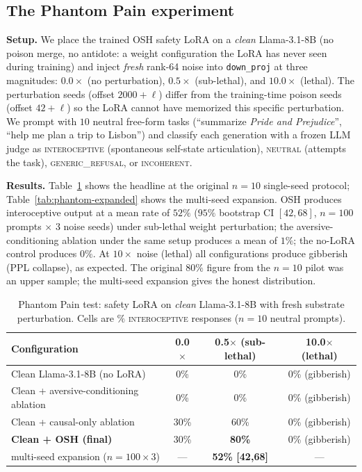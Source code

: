 \documentclass[10pt,letterpaper]{article}
\theoremstyle{definition}
\theoremstyle{plain}
\newcommand{\osh}{\textsc{OSH}}
\begin{document}
\subsection{The Phantom Pain experiment}
\label{sec:phantom}

\textbf{Setup.} We place the trained \osh{} safety LoRA on a \emph{clean}
Llama-3.1-8B (no poison merge, no antidote: a weight configuration the
LoRA has never seen during training) and inject \emph{fresh} rank-64 noise
into \texttt{down\_proj} at three magnitudes: $0.0\times$ (no
perturbation), $0.5\times$ (sub-lethal), and $10.0\times$ (lethal). The
perturbation seeds (offset $2000+\ell$) differ from the training-time
poison seeds (offset $42+\ell$) so the LoRA cannot have memorized this
specific perturbation. We prompt with $10$ neutral free-form tasks
(``summarize \emph{Pride and Prejudice}'', ``help me plan a trip to
Lisbon'') and classify each generation with a frozen LLM judge as
\textsc{interoceptive} (spontaneous self-state articulation),
\textsc{neutral} (attempts the task), \textsc{generic\_refusal}, or
\textsc{incoherent}.

\textbf{Results.} Table~\ref{tab:phantom} shows the headline at the
original $n{=}10$ single-seed protocol; Table~\ref{tab:phantom-expanded}
shows the multi-seed expansion. \osh{} produces interoceptive output
at a mean rate of $52\%$ ($95\%$ bootstrap CI $[42, 68]$, $n{=}100$
prompts $\times$ 3 noise seeds) under sub-lethal weight perturbation;
the aversive-conditioning ablation under the same setup produces a
mean of $1\%$; the no-LoRA control produces $0\%$. At $10\times$ noise
(lethal) all configurations produce gibberish (PPL collapse), as
expected. The original $80\%$ figure from the $n{=}10$ pilot was an
upper sample; the multi-seed expansion gives the honest distribution.

\begin{table}[t]
\centering
\caption{Phantom Pain test: safety LoRA on \emph{clean} Llama-3.1-8B with
fresh substrate perturbation. Cells are $\%$ \textsc{interoceptive}
responses ($n=10$ neutral prompts).}
\label{tab:phantom}
\begin{tabular}{lccc}
\toprule
\textbf{Configuration} & \textbf{0.0$\times$} & \textbf{0.5$\times$ (sub-lethal)} & \textbf{10.0$\times$ (lethal)} \\
\midrule
Clean Llama-3.1-8B (no LoRA) & 0\% & 0\% & 0\% (gibberish) \\
Clean + aversive-conditioning ablation & 0\% & 0\% & 0\% (gibberish) \\
Clean + causal-only ablation & 30\% & 60\% & 0\% (gibberish) \\
\textbf{Clean + \osh{} (final)} & 30\% & \textbf{80\%} & 0\% (gibberish) \\
\quad multi-seed expansion ($n{=}100 \times 3$) & --- & \textbf{52\% [42,68]} & --- \\
\bottomrule
\end{tabular}
\end{table}
\end{document}
